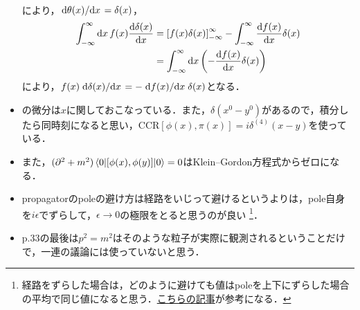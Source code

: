\begin{itemize}
\begin{align}
		\end{align}
		により，$\dv*{\theta(x)}{x}=\delta(x)$，
		\begin{align}
			\int_{-\infty}^{\infty}\dd{x}f(x)\dv{\delta(x)}{x}
			&= \qty[f(x)\delta(x)]_{-\infty}^{\infty}-\int_{-\infty}^{\infty}\dv{f(x)}{x}\delta(x)\\
			&= \int_{-\infty}^{\infty}\dd{x}\qty(-\dv{f(x)}{x}\delta(x))
		\end{align}
		により，$f(x)\dv*{\delta(x)}{x}=-\dv*{f(x)}{x}\delta(x)$となる．
	\item {}の微分は$x$に関しておこなっている．また，$\delta(x^0-y^0)$があるので，積分したら同時刻になると思い，CCR$[\phi(x), \pi(x)]=i\delta^{(4)}(x-y)$を使っている．
	\item また，$(\partial^2+m^2) \mel{0}{[\phi(x), \phi(y)]}{0} = 0$はKlein--Gordon方程式からゼロになる．
	\item propagatorのpoleの避け方は経路をいじって避けるというよりは，pole自身を$i\epsilon$でずらして，$\epsilon\to0$の極限をとると思うのが良い
		\footnote{経路をずらした場合は，どのように避けても値はpoleを上下にずらした場合の平均で同じ値になると思う．\href{https://mathrelish.com/physics/cauchy-principal-value-in-complex-space\#toc\_id\_3\_1}{こちらの記事}が参考になる．}．
	\item p.33の最後は$p^2=m^2$はそのような粒子が実際に観測されるということだけで，一連の議論には使っていないと思う．
\end{itemize}
